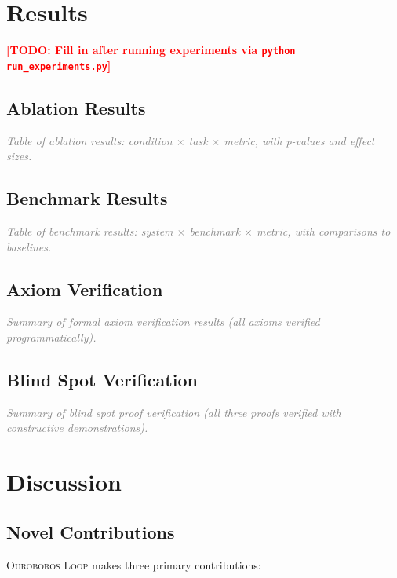\documentclass[11pt,a4paper]{article}
\newcommand{\OL}{\textsc{Ouroboros Loop}}
\newcommand{\todo}[1]{\textcolor{red}{\textbf{[TODO: #1]}}}
\newcommand{\placeholder}[1]{\textcolor{gray}{\textit{#1}}}
\begin{document}
\section{Results}
\label{sec:results}

\todo{Fill in after running experiments via \texttt{python run\_experiments.py}}

\subsection{Ablation Results}

\placeholder{Table of ablation results: condition $\times$ task $\times$
metric, with p-values and effect sizes.}

\subsection{Benchmark Results}

\placeholder{Table of benchmark results: system $\times$ benchmark $\times$
metric, with comparisons to baselines.}

\subsection{Axiom Verification}

\placeholder{Summary of formal axiom verification results (all axioms
verified programmatically).}

\subsection{Blind Spot Verification}

\placeholder{Summary of blind spot proof verification (all three proofs
verified with constructive demonstrations).}

\section{Discussion}
\label{sec:discussion}

\subsection{Novel Contributions}

\OL{} makes three primary contributions:
\end{document}
